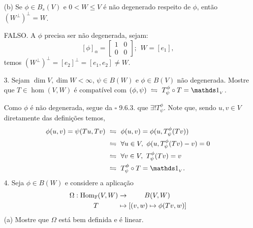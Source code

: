 (b) Se \(\phi \in B_s(V)\) e \(0 < W \leq V\) é não degenerado respeito de \(\phi\), então \((W^\perp)^\perp = W \).  

\textcolor{gris}{
FALSO. A \(\phi \) precisa ser não degenerada, sejam:  
\[[\phi]_\alpha = \begin{bmatrix}
  1 & 0 \\ 
  0 & 0 
\end{bmatrix}; \ \ W = [e_1], \]
temos \((W^\perp)^\perp = [e_2]^\perp = [e_1,e_2] \neq W\).  
}

3. Sejam \(\dim V, \dim W < \infty\), \(\psi \in B(W)\) e  \(\phi \in B(V)\)  não degenerada. Mostre que \(T\in \hom(V,W)\) é compatível com \((\phi, \psi)\ \leftrightharpoons \ T^\phi_\psi \circ T = \id_{_V}\).  

\textcolor{gris}{
  Como \(\phi\) é não degenerada, segue da \(\square\) 9.6.3. que \(\exists !T^\phi_\psi\). Note que,  sendo \( u, v \in V\) diretamente das definições temos, 
  \begin{align*}
    \phi(u, v) = \psi(Tu, Tv ) \ &\leftrightharpoons \ \phi(u,v) = \phi(u, T^\phi_\psi( Tv))\\ 
    & \leftrightharpoons \ \forall u \in V, \ \phi(u, T^\phi_\psi (Tv) -v ) = 0 \\ 
    & \leftrightharpoons \ \forall v \in V, \ T^\phi_\psi (Tv) = v \\ 
    & \leftrightharpoons \ T^\phi_\psi \circ T = \id_{_V}. 
  \end{align*}
} 
4. Seja \(\phi \in B(W)\) e considere a aplicação 
\begin{align*}
  \Omega: \hom(V,W) &\to \hspace{0.8cm}B(V,W) \\ 
T \hspace{1cm} &\mapsto [(v,w) \mapsto \phi(Tv, w )] 
\end{align*} 
(a) Mostre que \(\Omega\) está bem definida e é linear.  

